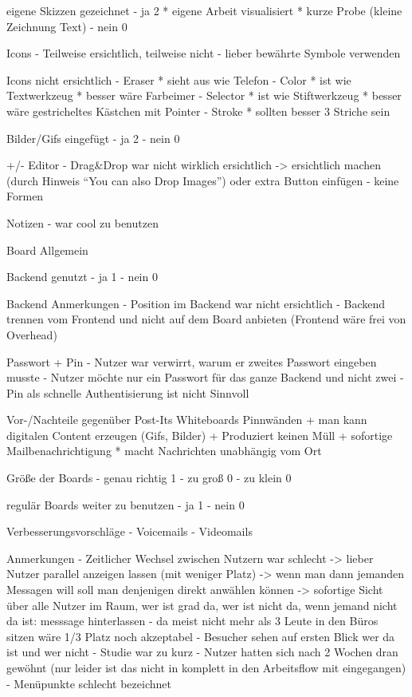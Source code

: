 eigene Skizzen gezeichnet
- ja 2
  * eigene Arbeit visualisiert
  * kurze Probe (kleine Zeichnung Text)
- nein 0

Icons
- Teilweise ersichtlich, teilweise nicht
- lieber bewährte Symbole verwenden

Icons nicht ersichtlich
- Eraser
  * sieht aus wie Telefon
- Color
  * ist wie Textwerkzeug
  * besser wäre Farbeimer
- Selector
  * ist wie Stiftwerkzeug
  * besser wäre gestricheltes Kästchen mit Pointer
- Stroke
  * sollten besser 3 Striche sein

Bilder/Gifs eingefügt
- ja 2
- nein 0

+/- Editor
- Drag&Drop war nicht wirklich ersichtlich -> ersichtlich machen (durch Hinweis ``You can also Drop Images'') oder extra Button einfügen
- keine Formen

Notizen
- war cool zu benutzen

Board Allgemein

Backend genutzt
- ja 1
- nein 0

Backend Anmerkungen
- Position im Backend war nicht ersichtlich
- Backend trennen vom Frontend und nicht auf dem Board anbieten (Frontend wäre frei von Overhead)

Passwort + Pin
- Nutzer war verwirrt, warum er zweites Passwort eingeben musste
- Nutzer möchte nur ein Passwort für das ganze Backend und nicht zwei
- Pin als schnelle Authentisierung ist nicht Sinnvoll

Vor-/Nachteile gegenüber Post-Its Whiteboards Pinnwänden
+ man kann digitalen Content erzeugen (Gifs, Bilder)
+ Produziert keinen Müll
+ sofortige Mailbenachrichtigung
  * macht Nachrichten unabhängig vom Ort

Größe der Boards
- genau richtig 1
- zu groß 0
- zu klein 0

regulär Boards weiter zu benutzen
- ja 1
- nein 0

Verbesserungsvorschläge
- Voicemails
- Videomails

Anmerkungen
- Zeitlicher Wechsel zwischen Nutzern war schlecht
  -> lieber Nutzer parallel anzeigen lassen (mit weniger Platz)
  -> wenn man dann jemanden Messagen will soll man denjenigen direkt anwählen können
  -> sofortige Sicht über alle Nutzer im Raum, wer ist grad da, wer ist nicht da, wenn jemand nicht da ist: messsage hinterlassen
  - da meist nicht mehr als 3 Leute in den Büros sitzen wäre 1/3 Platz noch akzeptabel
  - Besucher sehen auf ersten Blick wer da ist und wer nicht
- Studie war zu kurz - Nutzer hatten sich nach 2 Wochen dran gewöhnt (nur leider ist das nicht in komplett in den Arbeitsflow mit eingegangen)
- Menüpunkte schlecht bezeichnet